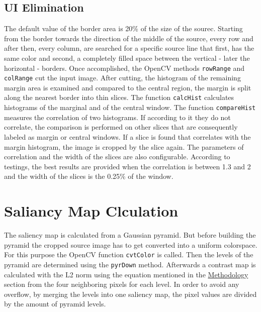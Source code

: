 \documentclass[draft,final]{vutinfth} %
\begin{document}
	\subsection{UI Elimination}
	The default value of the border area is 20\% of the size of the sourec. 
	Starting from the border towards the direction of the middle of the source, every row and after then, every column, are searched for a specific source line that first, has the same color and second, a completely filled space between the vertical - later the horizontal - borders.
	Once accomplished, the OpenCV methods \texttt{rowRange} and \texttt{colRange} cut the input image.
	After cutting, the histogram of the remaining margin area is examined and compared to the central region, the margin is split along the nearest border into thin slices.
	The function \texttt{calcHist} calculates histograms of the marginal and of the central window.
	The function \texttt{compareHist} measures the correlation of two histograms.
	If according to it they do not correlate, the comparison is performed on other slices that are consequently labeled as margin or central windows.
	If a slice is found that correlates with the margin histogram, the image is cropped by the slice again. 
	The parameters of correlation and the width of the slices are also configurable.
	According to testings, the best results are provided when the correlation is between 1.3 and 2 and the width of the slices is the 0.25\% of the window.
	
	\section{Saliancy Map Clculation}
	The saliency map is calculated from a Gaussian pyramid.
	But before building the pyramid the cropped source image has to get converted into a uniform colorspace.
	For this purpose the OpenCV function \texttt{cvtColor} is called.
	Then the levels of the pyramid are determined using the \texttt{pyrDown} method.
	Afterwards a contrast map is calculated with the L2 norm using the equation mentioned in the \hyperref[saliencyCalculation]{Methodology} section from the four neighboring pixels for each level.
	In order to avoid any overflow, by merging the levels into one saliency map, the pixel values are divided by the amount of pyramid levels.
	
\end{document}
